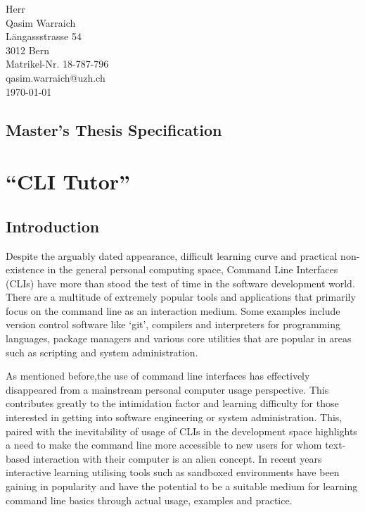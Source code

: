 \documentclass{task_description}
\begin{document}
\thispagestyle{firstpage}
\vspace*{23mm}%
\hfill\parbox[t]{65mm}{
Herr\\
Qasim Warraich\\
Längassstrasse 54\\
3012 Bern \\[3mm]
Matrikel-Nr. 18-787-796 \\
qasim.warraich@uzh.ch\\[15mm]
\today \\
}
\vspace*{5mm}

\subsection*{Master's Thesis Specification}

\section*{``CLI Tutor''}

\subsection*{Introduction}

Despite the arguably dated appearance, difficult learning curve and practical
non-existence in the general personal computing space, Command Line Interfaces
(CLIs) have more than stood the test of time in the software development world.
There are a multitude of extremely popular tools and applications that
primarily focus on the command line as an interaction medium. Some examples
include version control software like `git', compilers and interpreters for
programming languages, package managers and various core utilities that are
popular in areas such as scripting and system administration.

As mentioned before,the use of command line interfaces has effectively
disappeared from a mainstream personal computer usage perspective. This
contributes greatly to the intimidation factor and learning difficulty for
those interested in getting into software engineering or system administration.
This, paired with the inevitability of usage of CLIs in the development space
highlights a need to make the command line more accessible to new users for
whom text-based interaction with their computer is an alien concept. In recent
years interactive learning utilising tools such as sandboxed environments have
been gaining in popularity and have the potential to be a suitable medium for
learning command line basics through actual usage, examples and practice.
\end{document}
